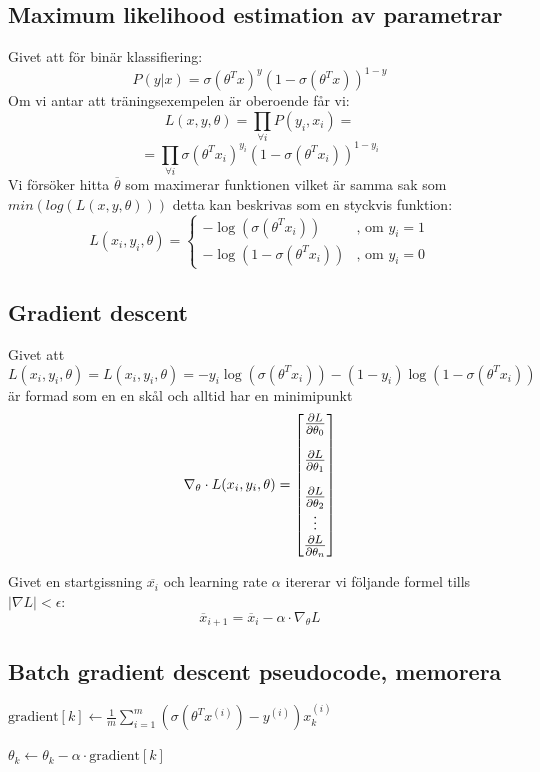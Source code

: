 \documentclass[12pt,a4paper]{article}
\begin{document}
 \newpage

\subsection*{Maximum likelihood estimation av parametrar}
Givet att för binär klassifiering:
$$P(y|x) = \sigma(\theta^Tx)^y(1-\sigma(\theta^Tx))^{1-y}$$
Om vi antar att träningsexempelen är oberoende får vi:
$$L(x,y,\theta) = \prod\limits_{\forall i}P(y_i, x_i) =$$
$$ =\prod\limits_{\forall i}\sigma(\theta^Tx_i)^{y_i}(1-\sigma(\theta^Tx_i))^{1-y_i}$$
Vi försöker hitta $\overline{\theta}$ som maximerar funktionen vilket är samma sak som $min(log(L(x,y,\theta)))$ detta kan beskrivas som en styckvis funktion:
$$L(x_{i}, y_{i}, {\theta}) =
\begin{cases}
    -\log(\sigma(\theta^T x_{i})) & \text{, om } y_{i} = 1 \\
    -\log(1 - \sigma(\theta^T x_{i})) & \text{, om } y_{i} = 0
\end{cases}$$

\subsection*{Gradient descent}
Givet att $$L(x_{i}, y_{i}, {\theta}) = L(x_i, y_i, \theta) = -y_i \log(\sigma(\theta^T x_i)) - (1 - y_i) \log(1 - \sigma(\theta^T x_i))$$ är formad som en en skål och alltid har en minimipunkt
$$
\nabla_{\theta} \cdot L(x_i, y_i, \theta) =
{\large \begin{bmatrix}
\frac{\partial L}{\partial \theta_0} \\[1em]
\frac{\partial L}{\partial \theta_1} \\[1em]
\frac{\partial L}{\partial \theta_2} \\
\vdots \\
\frac{\partial L}{\partial \theta_n}
\end{bmatrix}
}$$

Givet en startgissning $\overline{x_i}$ och learning rate $\alpha$ itererar vi följande formel tills $|\nabla L| < \epsilon$:
\vspace{6pt}
{\large $$\overline{x}_{i+1} = \overline{x}_i - \alpha \cdot \nabla_{\theta} L$$}
\newpage
\subsection*{Batch gradient descent pseudocode, memorera}
\begin{algorithm}
\caption{Gradient Descent Step}
\begin{algorithmic}
    \setlength{\baselineskip}{2em} 

    \Repeat
            \State $\text{gradient}[k] \gets \frac{1}{m} \sum_{i=1}^{m} \left( \sigma(\theta^T x^{(i)}) - y^{(i)} \right) x_k^{(i)}$
        \EndFor
        
            \State $\theta_k \gets \theta_k - \alpha \cdot \text{gradient}[k]$
        \EndFor
\end{algorithmic}
\end{algorithm}
\end{document}
